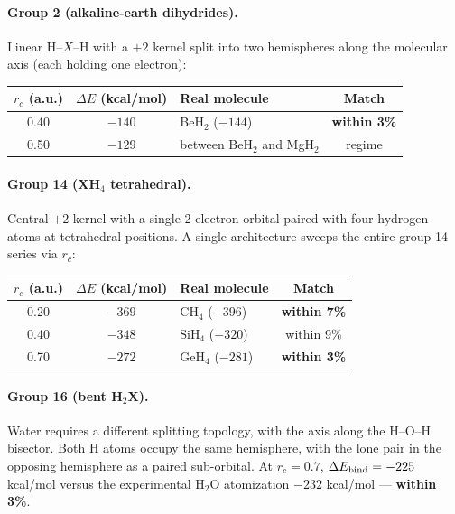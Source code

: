 \documentclass[11pt]{article}
\begin{document}
\paragraph{Group 2 (alkaline-earth dihydrides).}
Linear H--$X$--H with a $+2$ kernel split into two hemispheres along the molecular axis (each holding one electron):

\begin{center}
\begin{tabular}{c c l c}
\toprule
$r_c$ (a.u.) & $\Delta E$ (kcal/mol) & Real molecule & Match \\
\midrule
0.40 & $-140$ & BeH$_2$ ($-144$) & \textbf{within 3\%} \\
0.50 & $-129$ & between BeH$_2$ and MgH$_2$ & regime \\
\bottomrule
\end{tabular}
\end{center}

\paragraph{Group 14 (XH$_4$ tetrahedral).}
Central $+2$ kernel with a single 2-electron orbital paired with four hydrogen atoms at tetrahedral positions. A single architecture sweeps the entire group-14 series via $r_c$:

\begin{center}
\begin{tabular}{c c l c}
\toprule
$r_c$ (a.u.) & $\Delta E$ (kcal/mol) & Real molecule & Match \\
\midrule
0.20 & $-369$ & CH$_4$ ($-396$) & \textbf{within 7\%} \\
0.40 & $-348$ & SiH$_4$ ($-320$) & within 9\% \\
0.70 & $-272$ & GeH$_4$ ($-281$) & \textbf{within 3\%} \\
\bottomrule
\end{tabular}
\end{center}

\paragraph{Group 16 (bent H$_2$X).}
Water requires a different splitting topology, with the axis along the H--O--H bisector. Both H atoms occupy the same hemisphere, with the lone pair in the opposing hemisphere as a paired sub-orbital. At $r_c = 0.7$, $\Delta E_{\rm bind} = -225$ kcal/mol versus the experimental H$_2$O atomization $-232$ kcal/mol --- \textbf{within 3\%}.
\end{document}
